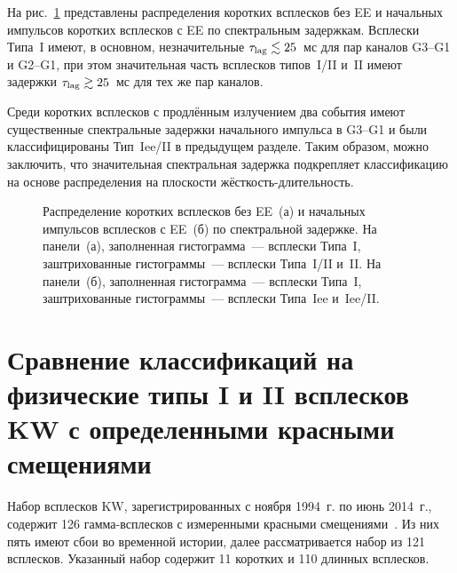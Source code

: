 На рис.~\ref{img:LagDistrs} представлены распределения коротких всплесков без EE и 
начальных импульсов коротких всплесков с EE по спектральным задержкам. 
Всплески Типа~I имеют, в основном, незначительные $\tau_{\mathrm{lag}}\lesssim 25$~мс для 
пар каналов G3--G1 и G2--G1, при этом значительная часть всплесков типов~I/II и~II 
имеют задержки $\tau_{\mathrm{lag}}\gtrsim 25$~мс для тех же пар каналов.

Среди коротких всплесков с продлённым излучением два события имеют существенные  %
спектральные задержки начального импульса в G3--G1 и были классифицированы Тип~Iee/II в предыдущем разделе. 
Таким образом, можно заключить, что значительная спектральная задержка подкрепляет классификацию 
на основе распределения на плоскости жёсткость-длительность.

\begin{figure}[h]
  \begin{minipage}[h]{0.5\textwidth}
  \end{minipage}
  \hfill
  \begin{minipage}[h]{0.5\textwidth}
  \end{minipage}
  \caption{Распределение коротких всплесков без EE~(а) и начальных импульсов 
  всплесков с EE~(б) по спектральной задержке.
  На панели~(а), заполненная гистограмма~--- всплески Типа~I, заштрихованные 
  гистограммы~--- всплески Типа~I/II и~II.  На панели~(б), заполненная 
  гистограмма~--- всплески Типа~I, заштрихованные гистограммы~--- всплески Типа~Iee и~Iee/II.}
  \label{img:LagDistrs}  
\end{figure}

\FloatBarrier

\section{Сравнение классификаций на физические типы I и II всплесков KW 
с определенными красными смещениями}\label{sec:Phys_Classification}
Набор всплесков KW, зарегистрированных с ноября 1994~г. по июнь 2014~г., 
содержит 126 гамма-всплесков с измеренными красными смещениями~\citep{Tsvetkova_KW_GRBs_with_z}. 
Из них пять имеют сбои во временной истории, далее рассматривается набор из 121 всплесков. 
Указанный набор содержит 11 коротких и 110 длинных всплесков. 

